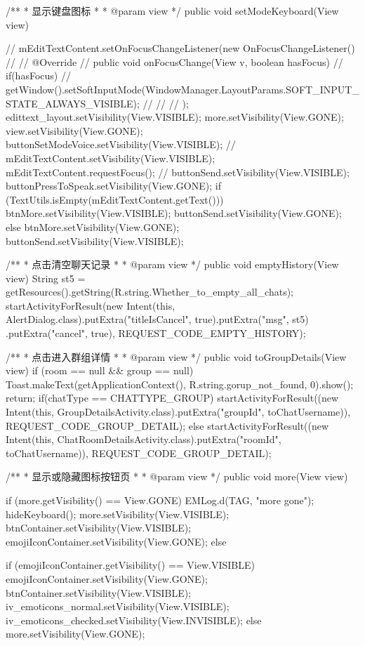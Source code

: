 {{	}

	/**
	 * 显示键盘图标
	 * 
	 * @param view
	 */
	public void setModeKeyboard(View view) {
		// mEditTextContent.setOnFocusChangeListener(new OnFocusChangeListener()
		// {
		// @Override
		// public void onFocusChange(View v, boolean hasFocus) {
		// if(hasFocus){
		// getWindow().setSoftInputMode(WindowManager.LayoutParams.SOFT_INPUT_STATE_ALWAYS_VISIBLE);
		// }
		// }
		// });
		edittext_layout.setVisibility(View.VISIBLE);
		more.setVisibility(View.GONE);
		view.setVisibility(View.GONE);
		buttonSetModeVoice.setVisibility(View.VISIBLE);
		// mEditTextContent.setVisibility(View.VISIBLE);
		mEditTextContent.requestFocus();
		// buttonSend.setVisibility(View.VISIBLE);
		buttonPressToSpeak.setVisibility(View.GONE);
		if (TextUtils.isEmpty(mEditTextContent.getText())) {
			btnMore.setVisibility(View.VISIBLE);
			buttonSend.setVisibility(View.GONE);
		} else {
			btnMore.setVisibility(View.GONE);
			buttonSend.setVisibility(View.VISIBLE);
		}

	}

	/**
	 * 点击清空聊天记录
	 * 
	 * @param view
	 */
	public void emptyHistory(View view) {
		String st5 = getResources().getString(R.string.Whether_to_empty_all_chats);
		startActivityForResult(new Intent(this, AlertDialog.class).putExtra("titleIsCancel", true).putExtra("msg", st5)
				.putExtra("cancel", true), REQUEST_CODE_EMPTY_HISTORY);
	}

	/**
	 * 点击进入群组详情
	 * 
	 * @param view
	 */
	public void toGroupDetails(View view) {
		if (room == null && group == null) {
			Toast.makeText(getApplicationContext(), R.string.gorup_not_found, 0).show();
			return;
		}
		if(chatType == CHATTYPE_GROUP){
			startActivityForResult((new Intent(this, GroupDetailsActivity.class).putExtra("groupId", toChatUsername)),
					REQUEST_CODE_GROUP_DETAIL);
		}else{
			startActivityForResult((new Intent(this, ChatRoomDetailsActivity.class).putExtra("roomId", toChatUsername)),
					REQUEST_CODE_GROUP_DETAIL);
		}
	}

	/**
	 * 显示或隐藏图标按钮页
	 * 
	 * @param view
	 */
	public void more(View view) {
		if (more.getVisibility() == View.GONE) {
			EMLog.d(TAG, "more gone");
			hideKeyboard();
			more.setVisibility(View.VISIBLE);
			btnContainer.setVisibility(View.VISIBLE);
			emojiIconContainer.setVisibility(View.GONE);
		} else {
			if (emojiIconContainer.getVisibility() == View.VISIBLE) {
				emojiIconContainer.setVisibility(View.GONE);
				btnContainer.setVisibility(View.VISIBLE);
				iv_emoticons_normal.setVisibility(View.VISIBLE);
				iv_emoticons_checked.setVisibility(View.INVISIBLE);
			} else {
				more.setVisibility(View.GONE);
			}

}}}
